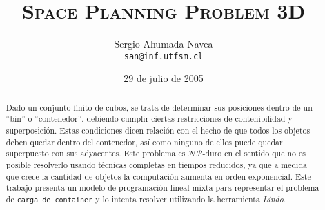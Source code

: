 \documentclass[letterpaper,11pt]{article}
\begin{document}
\title{\textsc{Space Planning Problem 3D}}
\author{\large{Sergio Ahumada Navea} \\ \texttt{san@inf.utfsm.cl}}
\date{29 de julio de 2005}

\maketitle

\begin{abstract}
Dado un conjunto finito de cubos, se trata de
determinar sus posiciones dentro de un ``bin'' o ``contenedor'',
debiendo cumplir ciertas restricciones de conteni\-bi\-li\-dad y superposición.
Estas condiciones dicen relación con el hecho de que todos los objetos
deben quedar dentro del contenedor,
así como ninguno de ellos puede quedar superpuesto con sus adyacentes.
Este problema es $\mathcal{NP}$-duro en el sentido que no es posible
resolverlo usando técnicas completas en tiempos reducidos, ya que a
medida que crece la cantidad de objetos la computación aumenta en orden
exponencial.
Este trabajo presenta un modelo de programación lineal mixta
para representar el problema de \texttt{carga de container} y lo intenta
resolver utilizando la herramienta \textit{Lindo}.
\end{abstract}






\pagebreak




\pagebreak


\pagebreak


\pagebreak


\pagebreak





\nocite{*}


\end{document}

